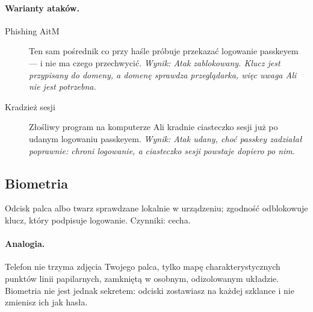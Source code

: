 \paragraph{Warianty ataków.}
\begin{description}
\item[Phishing AitM] Ten sam pośrednik co przy haśle próbuje przekazać logowanie passkeyem — i nie ma czego przechwycić. \emph{Wynik: Atak zablokowany. Klucz jest przypisany do domeny, a domenę sprawdza przeglądarka, więc uwaga Ali nie jest potrzebna.}
\item[Kradzież sesji] Złośliwy program na komputerze Ali kradnie ciasteczko sesji już po udanym logowaniu passkeyem. \emph{Wynik: Atak udany, choć passkey zadziałał poprawnie: chroni logowanie, a ciasteczko sesji powstaje dopiero po nim.}
\end{description}

\subsection{Biometria}
\label{sec:mech-biometria}
Odcisk palca albo twarz sprawdzane lokalnie w urządzeniu; zgodność odblokowuje klucz, który podpisuje logowanie. Czynniki: cecha. \cite{N6,P13,P14,P15,P16,N1,S1}

\paragraph{Analogia.} Telefon nie trzyma zdjęcia Twojego palca, tylko mapę charakterystycznych punktów linii papilarnych, zamkniętą w osobnym, odizolowanym układzie. Biometria nie jest jednak sekretem: odciski zostawiasz na każdej szklance i nie zmienisz ich jak hasła.

